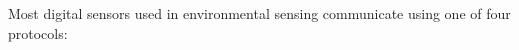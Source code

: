 Most digital sensors used in environmental sensing communicate using one of four protocols:

%	
%	
%	
%	
%	
